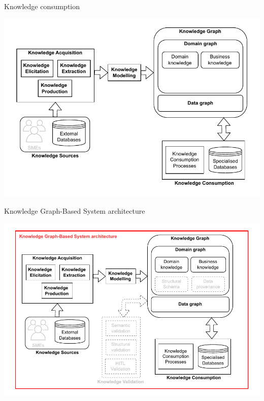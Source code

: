 \begin{frame}{Knowledge consumption}

        \begin{center}
            \includegraphics[scale=0.7]{images/KGBS-knowledge-consumption.pdf} 
        \end{center}

\end{frame}

\begin{frame}{Knowledge Graph-Based System architecture}

        \begin{center}
            \includegraphics[scale=0.6]{images/KGBS-architecture.pdf} 
        \end{center}

\end{frame}

